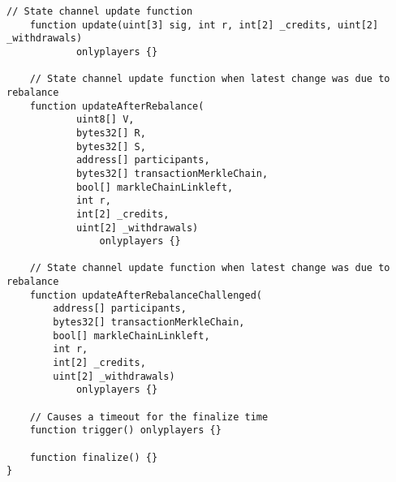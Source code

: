 \documentclass[sigconf]{acmart}
\begin{document}
\begin{lstlisting}[linewidth=\columnwidth,breaklines=true, caption={Smart contract defined in channel.sol. Adapted from the Sprites payment channel in \cite{sprites}.}]
    // State channel update function
    function update(uint[3] sig, int r, int[2] _credits, uint[2] _withdrawals)
            onlyplayers {}

    // State channel update function when latest change was due to rebalance
    function updateAfterRebalance(
            uint8[] V,
            bytes32[] R,
            bytes32[] S,
            address[] participants,
            bytes32[] transactionMerkleChain,
            bool[] markleChainLinkleft,
            int r,
            int[2] _credits,
            uint[2] _withdrawals)
                onlyplayers {}

    // State channel update function when latest change was due to rebalance
    function updateAfterRebalanceChallenged(
        address[] participants,
        bytes32[] transactionMerkleChain,
        bool[] markleChainLinkleft,
        int r,
        int[2] _credits,
        uint[2] _withdrawals)
            onlyplayers {}

    // Causes a timeout for the finalize time
    function trigger() onlyplayers {}

    function finalize() {}
}
\end{lstlisting}
\end{document}
